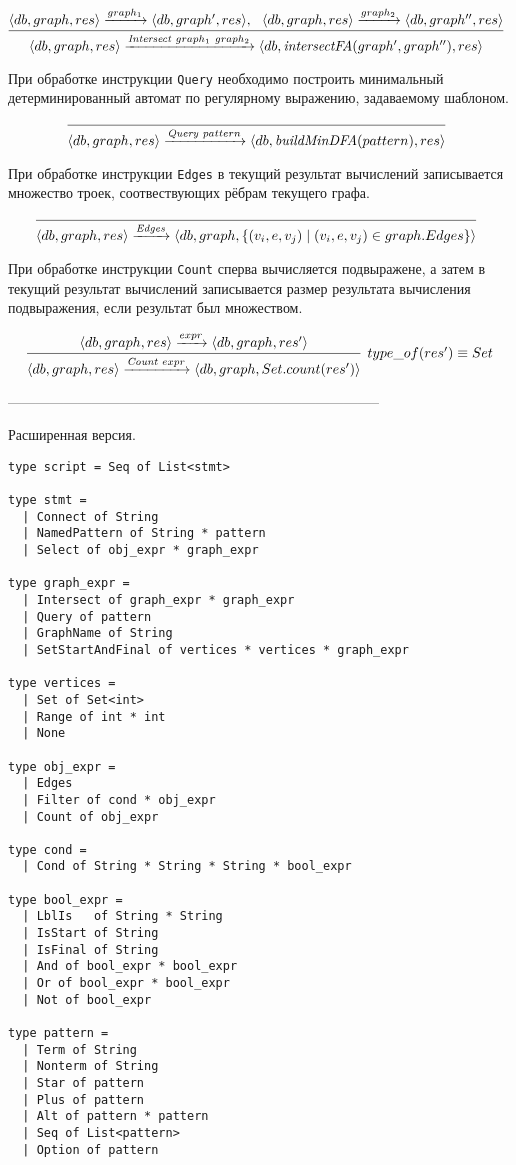 $$
\infer[]{\langle db, graph, res\rangle \xrightarrow{\textit{Intersect} \ graph_1 \ graph_2} \langle db, \textit{intersectFA}(graph', graph''), res\rangle}{\langle db, graph,res\rangle \xrightarrow{graph_1} \langle db, graph', res \rangle, \ \ \langle db, graph,res \rangle \xrightarrow{graph_2} \langle db, graph'', res \rangle}
$$


При обработке инструкции \verb|Query| необходимо построить минимальный детерминированный автомат по регулярному выражению, задаваемому шаблоном.

$$
\infer[]{\langle db, graph, res \rangle \xrightarrow{\textit{Query} \ pattern} \langle db, \textit{buildMinDFA}(pattern), res \rangle}{}
$$

При обработке инструкции \verb|Edges| в текущий результат вычислений записывается множество троек, соотвествующих рёбрам текущего графа.

$$
\infer[]{\langle db, graph, res \rangle \xrightarrow{\textit{Edges}} \langle db, graph, \{(v_i,e,v_j) \mid (v_i,e,v_j) \in graph.Edges\}\rangle}{}
$$

При обработке инструкции \verb|Count| сперва вычисляется подвыражене, а затем в текущий результат вычислений записывается размер результата вычисления подвыражения, если результат был множеством.

$$
\infer[type\_of(res') \equiv Set ]{\langle db, graph, res \rangle \xrightarrow{\textit{Count} \ expr} \langle db, graph, Set.count(res') \rangle}{\langle db, graph, res \rangle \xrightarrow{expr} \langle db, graph, res' \rangle}
$$

--------------------------------------------------------------------------------




Расширенная версия.

\begin{verbatim}
type script = Seq of List<stmt>

type stmt =
  | Connect of String
  | NamedPattern of String * pattern
  | Select of obj_expr * graph_expr

type graph_expr =
  | Intersect of graph_expr * graph_expr
  | Query of pattern
  | GraphName of String
  | SetStartAndFinal of vertices * vertices * graph_expr

type vertices =
  | Set of Set<int>
  | Range of int * int
  | None

type obj_expr =
  | Edges
  | Filter of cond * obj_expr
  | Count of obj_expr

type cond =
  | Cond of String * String * String * bool_expr

type bool_expr =
  | LblIs   of String * String
  | IsStart of String
  | IsFinal of String
  | And of bool_expr * bool_expr
  | Or of bool_expr * bool_expr
  | Not of bool_expr

type pattern =
  | Term of String
  | Nonterm of String
  | Star of pattern
  | Plus of pattern
  | Alt of pattern * pattern
  | Seq of List<pattern>
  | Option of pattern

\end{verbatim}


